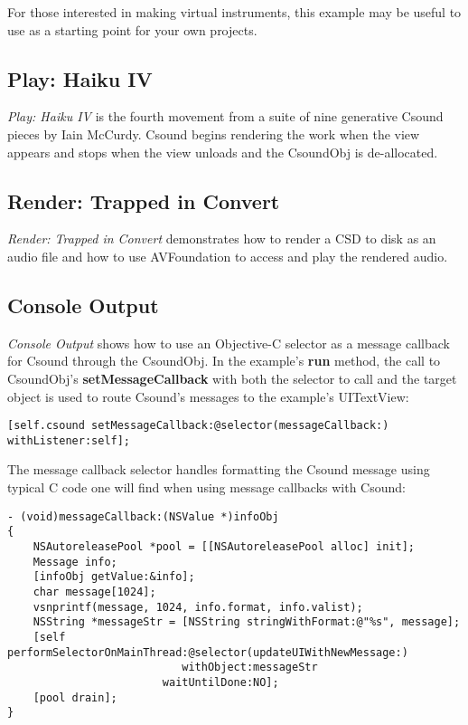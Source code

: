 \documentclass[11pt]{article}
\begin{document}
For those interested in making virtual instruments, this example may be useful to use as a starting point for your own projects.

\subsection{Play: Haiku IV}

\emph{Play: Haiku IV} is the fourth movement from a suite of nine generative Csound pieces by Iain McCurdy. Csound begins rendering the work when the view appears and stops when the view unloads and the CsoundObj is de-allocated.   

\subsection{Render: Trapped in Convert}

\emph{Render: Trapped in Convert} demonstrates how to render a CSD to disk as an audio file and how to use AVFoundation to access and play the rendered audio.   

\subsection{Console Output}

\emph{Console Output} shows how to use an Objective-C selector as a message callback for Csound through the CsoundObj.  In the example's \textbf{run} method, the call to CsoundObj's \textbf{setMessageCallback} with both the selector to call and the target object is used to route Csound's messages to the example's UITextView:

\begin{lstlisting}[caption=Example of setting message callback]
    [self.csound setMessageCallback:@selector(messageCallback:) withListener:self];
\end{lstlisting}

The message callback selector handles formatting the Csound message using typical C code one will find when using message callbacks with Csound:

\begin{lstlisting}[caption=Message Callback Selector Code]
- (void)messageCallback:(NSValue *)infoObj
{
    NSAutoreleasePool *pool = [[NSAutoreleasePool alloc] init];
    Message info;
    [infoObj getValue:&info];
    char message[1024];
    vsnprintf(message, 1024, info.format, info.valist);
    NSString *messageStr = [NSString stringWithFormat:@"%s", message];
    [self performSelectorOnMainThread:@selector(updateUIWithNewMessage:)
                           withObject:messageStr
                        waitUntilDone:NO];
    [pool drain];
}
\end{lstlisting}
\end{document}
